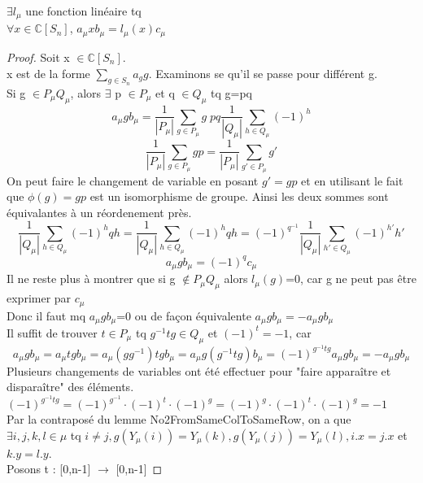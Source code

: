 \begin{lemma}[LinearTransformation]
    \label{LinearTransformation}
    \leanok
    $\exists l_{\mu}$ une fonction linéaire tq\\
    $\forall x \in \mathbb{C}[S_{n}]$, $a_{\mu} x b_{\mu} = l_{\mu}(x) c_{\mu}$
\end{lemma}
\begin{proof}
    Soit x $\in \mathbb{C}[S_{n}]$.\\
    x est de la forme $\sum_{g \in S_n} a_g g$. Examinons se qu'il se passe pour différent g.\\
    Si g $\in P_{\mu} Q_{\mu}$, alors $\exists$ p $\in P_{\mu}$ et q $\in Q_{\mu}$ tq g=pq\\
    \[ a_{\mu} g b_{\mu} = \frac{1}{|P_{\mu}|}\sum_{g \in P_{\mu}}g \; p q \frac{1}{|Q_{\mu}|}\sum_{h \in Q_{\mu}}(-1)^{h} \]
    \[ \frac{1}{|P_{\mu}|}\sum_{g \in P_{\mu}}g p = \frac{1}{|P_{\mu}|}\sum_{g' \in P_{\mu}}g' \]
    On peut faire le changement de variable en posant $g' = g p$ et en utilisant le fait que $\phi (g) =g p$ est un isomorphisme de groupe. Ainsi les deux sommes sont équivalantes à un réordenement près.
    \[ \frac{1}{|Q_{\mu}|}\sum_{h \in Q_{\mu}}(-1)^{h}q h = \frac{1}{|Q_{\mu}|}\sum_{h \in Q_{\mu}}(-1)^{h}q h = (-1)^{q^{-1}} \frac{1}{|Q_{\mu}|}\sum_{h' \in Q_{\mu}}(-1)^{h'}h' \]
    \[ a_{\mu} g b_{\mu} = (-1)^{q}c_{\mu} \]
    Il ne reste plus à montrer que si g $\notin P_{\mu} Q_{\mu}$ alors $l_{\mu}(g)$=0, car g ne peut pas être exprimer par $c_{\mu}$\\
    Donc il faut mq $a_{\mu} g b_{\mu}$=0 ou de façon équivalente $a_{\mu} g b_{\mu} = -a_{\mu} g b_{\mu}$\\
    Il suffit de trouver $t \in P_{\mu}$ tq $g^{-1} t g \in Q_{\mu}$ et $(-1)^t = -1$, car
    \[ a_{\mu} g b_{\mu} = a_{\mu} t g b_{\mu} = a_{\mu} (g g^{-1}) t g b_{\mu} = a_{\mu} g (g^{-1} t g) b_{\mu} = (-1)^{g^{-1} t g} a_{\mu} g b_{\mu} = -a_{\mu} g b_{\mu} \]
    Plusieurs changements de variables ont été effectuer pour "faire apparaître et disparaître" des éléments. $(-1)^{g^{-1} t g} = (-1)^{g^{-1}}\cdot (-1)^{t}\cdot (-1)^{g} = (-1)^{g}\cdot (-1)^{t}\cdot (-1)^{g} = -1$\\
    Par la contraposé du lemme No2FromSameColToSameRow, on a que\\
    $\exists i,j,k,l \in \mu$ tq $i \neq j, g(Y_{\mu}(i))=Y_{\mu}(k), g(Y_{\mu}(j))=Y_{\mu}(l), i.x=j.x$ et $k.y = l.y$.\\
    Posons t : [0,n-1] $\to$ [0,n-1]

\end{proof}
